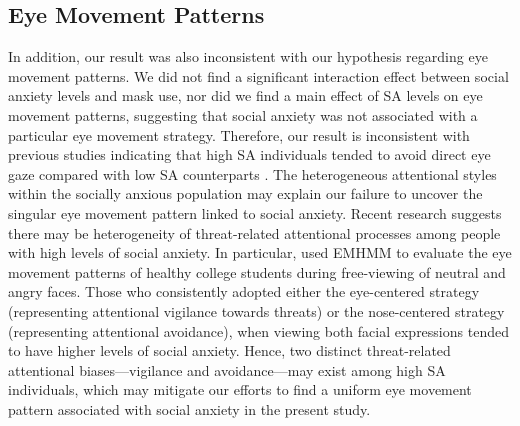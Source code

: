 \subsection{Eye Movement Patterns}
In addition, our result was also inconsistent with our hypothesis regarding eye movement patterns. We did not find a significant interaction effect between social anxiety levels and mask use, nor did we find a main effect of SA levels on eye movement patterns, suggesting that social anxiety was not associated with a particular eye movement strategy. Therefore, our result is inconsistent with previous studies indicating that high SA individuals tended to avoid direct eye gaze compared with low SA counterparts \citep{horley2003social,weeks2019fear}. The heterogeneous attentional styles within the socially anxious population may explain our failure to uncover the singular eye movement pattern linked to social anxiety. Recent research suggests there may be heterogeneity of threat-related attentional processes among people with high levels of social anxiety. In particular, \citet{Chan16112020} used EMHMM to evaluate the eye movement patterns of healthy college students during free-viewing of neutral and angry faces. Those who consistently adopted either the eye-centered strategy (representing attentional vigilance towards threats) or the nose-centered strategy (representing attentional avoidance), when viewing both facial expressions tended to have higher levels of social anxiety. Hence, two distinct threat-related attentional biases—vigilance and avoidance—may exist among high SA individuals, which may mitigate our efforts to find a uniform eye movement pattern associated with social anxiety in the present study.



